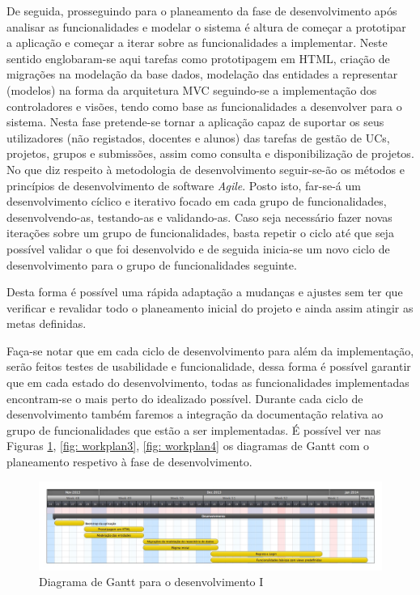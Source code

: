 De seguida, prosseguindo para o planeamento da fase de desenvolvimento após 
analisar as funcionalidades e modelar o sistema  é altura de começar a 
prototipar a aplicação e começar a iterar sobre as funcionalidades a 
implementar. Neste sentido englobaram-se aqui tarefas como prototipagem em HTML, 
criação de migrações na modelação da base dados, modelação das entidades a 
representar (modelos) na forma da arquitetura MVC seguindo-se a implementação dos 
controladores e visões, tendo como base as funcionalidades a desenvolver para o 
sistema. Nesta fase pretende-se tornar a aplicação capaz de suportar os seus 
utilizadores (não registados, docentes e alunos) das tarefas de gestão de UCs, 
projetos, grupos e submissões, assim como consulta e disponibilização de 
projetos. No que diz respeito à metodologia de desenvolvimento seguir-se-ão 
os métodos e princípios de desenvolvimento de software \textit{Agile}. Posto isto, 
far-se-á um desenvolvimento cíclico e iterativo focado em cada grupo de 
funcionalidades, desenvolvendo-as, testando-as e validando-as. Caso seja 
necessário fazer novas iterações sobre um grupo de funcionalidades, basta 
repetir o ciclo até que seja possível validar o que foi desenvolvido e de seguida inicia-se 
um novo ciclo de desenvolvimento para o grupo de funcionalidades seguinte.

Desta forma é possível uma rápida adaptação a mudanças e ajustes sem ter que verificar e 
revalidar todo o planeamento inicial do projeto e ainda assim atingir as metas 
definidas.

Faça-se notar que em cada ciclo de desenvolvimento para além da implementação,
 serão feitos testes de usabilidade e funcionalidade, dessa forma é possível garantir que em cada estado do 
desenvolvimento, todas as funcionalidades implementadas encontram-se o mais perto 
do idealizado possível.
Durante cada ciclo de desenvolvimento também faremos a integração da 
documentação relativa ao grupo de funcionalidades que estão a ser implementadas.
É possível ver nas Figuras \ref{fig: workplan2}, \ref{fig: workplan3}, \ref{fig: workplan4} 
os diagramas de Gantt com o planeamento respetivo à fase de desenvolvimento.

\begin{figure}[H] 
  \centering
  \includegraphics[width=1\textwidth]{images/plano_de_trabalho/gannt_2.png}
  \caption{Diagrama de Gantt para o desenvolvimento I}
  \label{fig: workplan2}
\end{figure}

